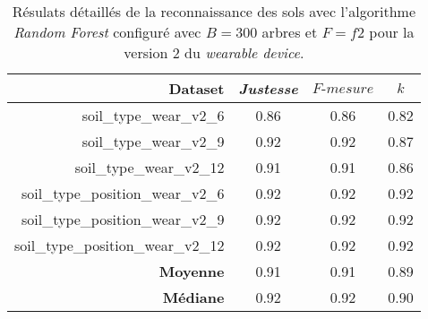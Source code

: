 \begin{table}[H]\renewcommand{\arraystretch}{0.5}
	\centering
	\caption{Résulats détaillés de la reconnaissance des sols avec l'algorithme \textit{Random Forest} configuré avec $B=300$ arbres et $F=f2$ pour la version 2 du \textit{wearable device}.}
	\label{tab:tab:rf-300-f2-wear-v2}
	\begin{tabular}{@{}rccc@{}}
		\toprule
			\textbf{Dataset} & \textit{Justesse} & $F\mbox{-} mesure$ & \textbf{$k$} \\
		\midrule
			soil\_type\_wear\_v2\_6 & 0.86 & 0.86 & 0.82 \\
			soil\_type\_wear\_v2\_9 & 0.92 & 0.92 & 0.87 \\
			soil\_type\_wear\_v2\_12 & 0.91 & 0.91 & 0.86 \\
			soil\_type\_position\_wear\_v2\_6 & 0.92 & 0.92 & 0.92 \\
			soil\_type\_position\_wear\_v2\_9 & 0.92 & 0.92 & 0.92 \\
			soil\_type\_position\_wear\_v2\_12 & 0.92 & 0.92 & 0.92 \\
			\textbf{Moyenne} & 0.91 & 0.91 & 0.89 \\
			\textbf{Médiane} & 0.92 & 0.92 & 0.90 \\
		\bottomrule
	\end{tabular}
\end{table}


